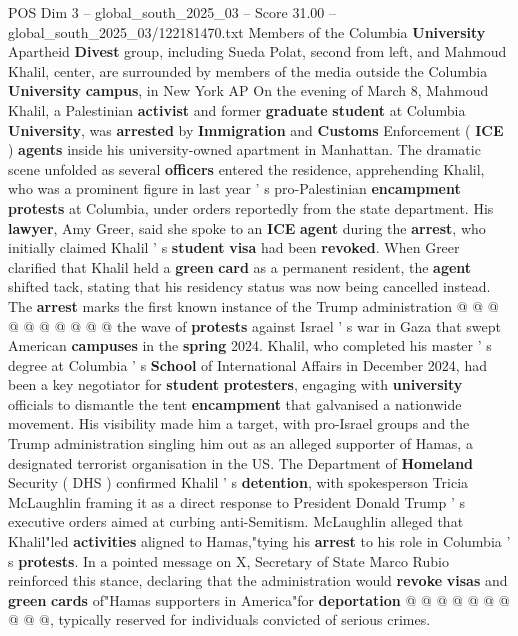 \begin{textsample}{POS Dim 3 – global\_south\_2025\_03 – Score 31.00 – global\_south\_2025\_03/122181470.txt}  \label{ex:f3_pos_033}
Members of the Columbia \textbf{University} Apartheid \textbf{Divest} group, including Sueda Polat, second from left, and Mahmoud Khalil, center, are surrounded by members of the media outside the Columbia \textbf{University} \textbf{campus}, in New York AP On the evening of March 8, Mahmoud Khalil, a Palestinian \textbf{activist} and former \textbf{graduate} \textbf{student} at Columbia \textbf{University}, was \textbf{arrested} by \textbf{Immigration} and \textbf{Customs} Enforcement ( \textbf{ICE} ) \textbf{agents} inside his university-owned apartment in Manhattan.
The dramatic scene unfolded as several \textbf{officers} entered the residence, apprehending Khalil, who was a prominent figure in last year ' s pro-Palestinian \textbf{encampment} \textbf{protests} at Columbia, under orders reportedly from the state department.
His \textbf{lawyer}, Amy Greer, said she spoke to an \textbf{ICE} \textbf{agent} during the \textbf{arrest}, who initially claimed Khalil ' s \textbf{student} \textbf{visa} had been \textbf{revoked}.
When Greer clarified that Khalil held a \textbf{green} \textbf{card} as a permanent resident, the \textbf{agent} shifted tack, stating that his residency status was now being cancelled instead.
The \textbf{arrest} marks the first known instance of the Trump administration @ @ @ @ @ @ @ @ @ @ the wave of \textbf{protests} against Israel ' s war in Gaza that swept American \textbf{campuses} in the \textbf{spring} 2024.
Khalil, who completed his master ' s degree at Columbia ' s \textbf{School} of International Affairs in December 2024, had been a key negotiator for \textbf{student} \textbf{protesters}, engaging with \textbf{university} officials to dismantle the tent \textbf{encampment} that galvanised a nationwide movement.
His visibility made him a target, with pro-Israel groups and the Trump administration singling him out as an alleged supporter of Hamas, a designated terrorist organisation in the US.
The Department of \textbf{Homeland} Security ( DHS ) confirmed Khalil ' s \textbf{detention}, with spokesperson Tricia McLaughlin framing it as a direct response to President Donald Trump ' s executive orders aimed at curbing anti-Semitism.
McLaughlin alleged that Khalil"led \textbf{activities} aligned to Hamas,"tying his \textbf{arrest} to his role in Columbia ' s \textbf{protests}.
In a pointed message on X, Secretary of State Marco Rubio reinforced this stance, declaring that the administration would \textbf{revoke} \textbf{visas} and \textbf{green} \textbf{cards} of"Hamas supporters in America"for \textbf{deportation} @ @ @ @ @ @ @ @ @ @, typically reserved for individuals convicted of serious crimes.

\end{textsample}
